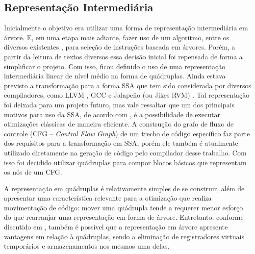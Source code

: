 

\subsection{Representação Intermediária}
\label{intermediate}

Inicialmente o objetivo era utilizar uma forma de representação
intermediária em árvore. E, em uma etapa mais adiante,
fazer uso de um algoritmo, entre os diversos existentes \cite{noltis}\cite{ir_tree_parsing}\cite{instrselec-dynamic}, para seleção
de instruções baseada em árvores. %
Porém, a partir da leitura de
textos diversos\cite{dragonbook}\cite{muchnick} essa decisão inicial foi repensada de forma a
simplificar o projeto.
Com isso, ficou definido o uso de uma representação intermediária
linear de nível médio na forma de quádruplas.
Ainda estava previsto a transformação para a forma SSA \cite{cytron} que
tem sido considerada por diversos compiladores, como LLVM
\cite{llvm1}, GCC \cite{gcc-ssa} e Jalapeño (ou Jikes RVM)
\cite{jalapeno_1}. Tal representação foi deixada para um projeto futuro,
mas vale ressaltar que um dos principais motivos para uso da SSA, de
acordo com , é a possibilidade de executar
otimizações clássicas de maneira eficiente.
A construção do grafo de fluxo de controle (CFG
-- \textit{Control Flow Graph})\cite{muchnick} de um trecho de código específico faz
parte dos requisitos para a transformação em SSA, porém ele também é
atualmente utilizado diretamente na geração de código pelo compilador
desse trabalho. Com isso
foi decidido utilizar quádruplas para compor blocos
básicos que representam os nós de um CFG.

A representação em quádruplas é relativamente simples de se construir,
além de apresentar uma característica relevante para a otimização que
realiza movimentação de código: mover uma quádrupla tende a requerer
menor esforço do que rearranjar uma representação em forma de
árvore. Entretanto, conforme discutido em ,
também é possível que a representação em árvore apresente vantagens
em relação à quádruplas, sendo a eliminação de registradores virtuais
temporários e armazenamentos nos mesmos uma delas.

